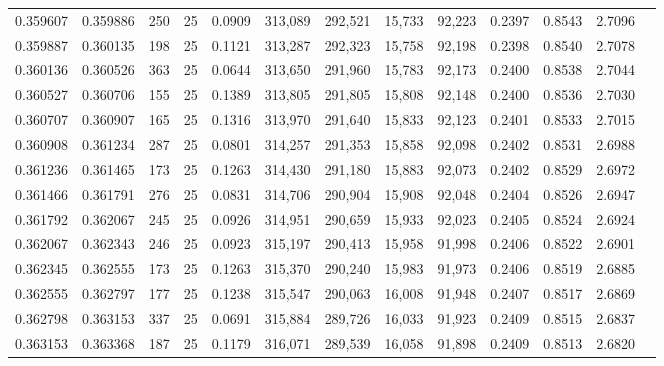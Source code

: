 \begin{tabular}{rrrrrrrrrrrrr}
0.359607 & 0.359886 &   250 &  25 &                                     0.0909 & 313,089 & 292,521 &  15,733 &  92,223 & 0.2397 & 0.8543 & 2.7096 \\
0.359887 & 0.360135 &   198 &  25 &                                     0.1121 & 313,287 & 292,323 &  15,758 &  92,198 & 0.2398 & 0.8540 & 2.7078 \\
0.360136 & 0.360526 &   363 &  25 &                                     0.0644 & 313,650 & 291,960 &  15,783 &  92,173 & 0.2400 & 0.8538 & 2.7044 \\
0.360527 & 0.360706 &   155 &  25 &                                     0.1389 & 313,805 & 291,805 &  15,808 &  92,148 & 0.2400 & 0.8536 & 2.7030 \\
0.360707 & 0.360907 &   165 &  25 &                                     0.1316 & 313,970 & 291,640 &  15,833 &  92,123 & 0.2401 & 0.8533 & 2.7015 \\
0.360908 & 0.361234 &   287 &  25 &                                     0.0801 & 314,257 & 291,353 &  15,858 &  92,098 & 0.2402 & 0.8531 & 2.6988 \\
0.361236 & 0.361465 &   173 &  25 &                                     0.1263 & 314,430 & 291,180 &  15,883 &  92,073 & 0.2402 & 0.8529 & 2.6972 \\
0.361466 & 0.361791 &   276 &  25 &                                     0.0831 & 314,706 & 290,904 &  15,908 &  92,048 & 0.2404 & 0.8526 & 2.6947 \\
0.361792 & 0.362067 &   245 &  25 &                                     0.0926 & 314,951 & 290,659 &  15,933 &  92,023 & 0.2405 & 0.8524 & 2.6924 \\
0.362067 & 0.362343 &   246 &  25 &                                     0.0923 & 315,197 & 290,413 &  15,958 &  91,998 & 0.2406 & 0.8522 & 2.6901 \\
0.362345 & 0.362555 &   173 &  25 &                                     0.1263 & 315,370 & 290,240 &  15,983 &  91,973 & 0.2406 & 0.8519 & 2.6885 \\
0.362555 & 0.362797 &   177 &  25 &                                     0.1238 & 315,547 & 290,063 &  16,008 &  91,948 & 0.2407 & 0.8517 & 2.6869 \\
0.362798 & 0.363153 &   337 &  25 &                                     0.0691 & 315,884 & 289,726 &  16,033 &  91,923 & 0.2409 & 0.8515 & 2.6837 \\
0.363153 & 0.363368 &   187 &  25 &                                     0.1179 & 316,071 & 289,539 &  16,058 &  91,898 & 0.2409 & 0.8513 & 2.6820 \\

\end{tabular}
